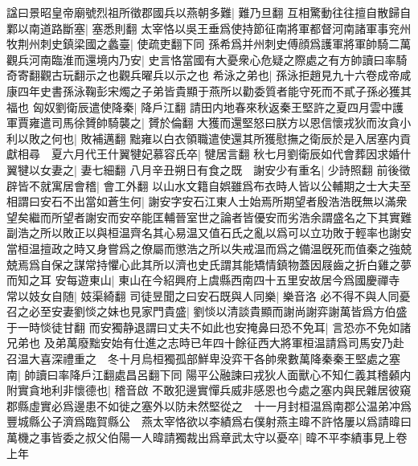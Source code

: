 諡曰景昭皇帝廟號烈祖所徵郡國兵以燕朝多難|{
	難乃旦翻}
互相驚動往往擅自散歸自鄴以南道路斷塞|{
	塞悉則翻}
太宰恪以吳王垂爲使持節征南將軍都督河南諸軍事兖州牧荆州刺史鎮梁國之蠡臺|{
	使疏吏翻下同}
孫希爲并州刺史傅顔爲護軍將軍帥騎二萬觀兵河南臨淮而還境内乃安|{
	史言恪當國有大憂衆心危疑之際處之有方帥讀曰率騎奇寄翻觀古玩翻示之也觀兵曜兵以示之也}
希泳之弟也|{
	孫泳拒趙見九十六卷成帝咸康四年史書孫泳鞠彭宋燭之子弟皆貴顯于燕所以勸委質者能守死而不貳子孫必獲其福也}
匈奴劉衛辰遣使降秦|{
	降戶江翻}
請田内地春來秋返秦王堅許之夏四月雲中護軍賈雍遣司馬徐贇帥騎襲之|{
	贇於倫翻}
大獲而還堅怒曰朕方以恩信懷戎狄而汝貪小利以敗之何也|{
	敗補邁翻}
黜雍以白衣領職遣使還其所獲慰撫之衛辰於是入居塞内貢獻相尋　夏六月代王什翼犍妃慕容氏卒|{
	犍居言翻}
秋七月劉衛辰如代會葬因求婚什翼犍以女妻之|{
	妻七細翻}
八月辛丑朔日有食之既　謝安少有重名|{
	少詩照翻}
前後徵辟皆不就寓居會稽|{
	會工外翻}
以山水文籍自娯雖爲布衣時人皆以公輔期之士大夫至相謂曰安石不出當如蒼生何|{
	謝安字安石江東人士始焉所期望者殷浩浩旣無以滿衆望矣繼而所望者謝安而安卒能匡輔晉室世之論者皆優安而劣浩余謂盛名之下其實難副浩之所以敗正以與桓温齊名其心易温又值石氏之亂以爲可以立功敗于輕率也謝安當桓温擅政之時又身嘗爲之僚屬而懲浩之所以失戒温而爲之備温旣死而值秦之強兢兢焉爲自保之謀常持懼心此其所以濟也史氏謂其能矯情鎮物蓋因屐齒之折白雞之夢而知之耳}
安每遊東山|{
	東山在今紹興府上虞縣西南四十五里安故居今爲國慶禪寺}
常以妓女自随|{
	妓渠綺翻}
司徒昱聞之曰安石既與人同樂|{
	樂音洛}
必不得不與人同憂召之必至安妻劉惔之妹也見家門貴盛|{
	劉惔以清談貴顯而謝尚謝弈謝萬皆爲方伯盛于一時惔徒甘翻}
而安獨静退謂曰丈夫不如此也安掩鼻曰恐不免耳|{
	言恐亦不免如諸兄弟也}
及弟萬廢黜安始有仕進之志時已年四十餘征西大將軍桓温請爲司馬安乃赴召温大喜深禮重之　冬十月烏桓獨孤部鮮卑没弈干各帥衆數萬降秦秦王堅處之塞南|{
	帥讀曰率降戶江翻處昌呂翻下同}
陽平公融諫曰戎狄人面獸心不知仁義其稽顙内附實貪地利非懷德也|{
	稽音啟}
不敢犯邊實憚兵威非感恩也今處之塞内與民雜居彼窺郡縣虛實必爲邊患不如徙之塞外以防未然堅從之　十一月封桓温爲南郡公温弟冲爲豐城縣公子濟爲臨賀縣公　燕太宰恪欲以李績爲右僕射燕主暐不許恪屢以爲請暐曰萬機之事皆委之叔父伯陽一人暐請獨裁出爲章武太守以憂卒|{
	暐不平李績事見上卷上年}


